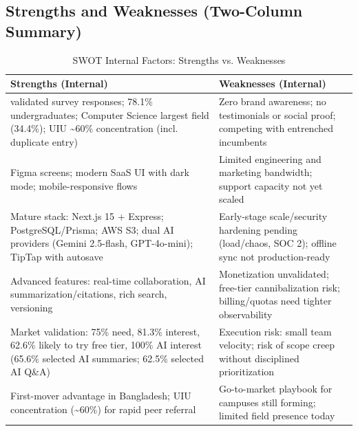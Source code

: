 \subsection{Strengths and Weaknesses (Two-Column Summary)}

\begin{table}[H]
    \centering
    \small
    \begin{tabularx}{\textwidth}{|>{\raggedright\arraybackslash}X|>{\raggedright\arraybackslash}X|}
        \hline
        \textbf{Strengths (Internal)}                                                                                                                                  & \textbf{Weaknesses (Internal)}                                                                      \\
        \hline
        32 validated survey responses; 78.1\% undergraduates; Computer Science largest field (34.4\%); UIU \textasciitilde{}60\% concentration (incl. duplicate entry) & Zero brand awareness; no testimonials or social proof; competing with entrenched incumbents         \\
        \hline
        102 Figma screens; modern SaaS UI with dark mode; mobile-responsive flows                                                                                      & Limited engineering and marketing bandwidth; support capacity not yet scaled                        \\
        \hline
        Mature stack: Next.js 15 + Express; PostgreSQL/Prisma; AWS S3; dual AI providers (Gemini 2.5-flash, GPT-4o-mini); TipTap with autosave                         & Early-stage scale/security hardening pending (load/chaos, SOC 2); offline sync not production-ready \\
        \hline
        Advanced features: real-time collaboration, AI summarization/citations, rich search, versioning                                                                & Monetization unvalidated; free-tier cannibalization risk; billing/quotas need tighter observability \\
        \hline
        Market validation: 75\% need, 81.3\% interest, 62.6\% likely to try free tier, 100\% AI interest (65.6\% selected AI summaries; 62.5\% selected AI Q\&A)       & Execution risk: small team velocity; risk of scope creep without disciplined prioritization         \\
        \hline
        First-mover advantage in Bangladesh; UIU concentration (\textasciitilde{}60\%) for rapid peer referral                                                         & Go-to-market playbook for campuses still forming; limited field presence today                      \\
        \hline
    \end{tabularx}
    \caption{SWOT Internal Factors: Strengths vs. Weaknesses}
    \label{table:swot-internal}
\end{table}

